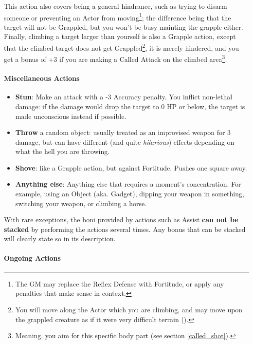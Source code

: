 \begin{itemize}
    This action also covers being a general hindrance, such as trying to disarm someone or preventing an Actor from moving\footnote{The GM may replace the Reflex Defense with Fortitude, or apply any penalties that make sense in context.}; the difference being that the target will not be Grappled, but you won't be busy mainting the grapple either. \\
    Finally, climbing a target larger than yourself is also a Grapple action, except that the climbed target does not get Grappled\footnote{You will move along the Actor which you are climbing, and may move upon the grappled creature as if it were very difficult terrain ().}, it is merely hindered, and you get a bonus of +3 if you are making a Called Attack on the climbed area\footnote{Meaning, you aim for this specific body part (see section \ref{called_shot}).}.
\end{itemize}



\paragraph{Miscellaneous Actions}
\begin{itemize}
    \item \textbf{Stun}: Make an attack with a -3 Accuracy penalty. You inflict non-lethal damage: if the damage would drop the target to 0 HP or below, the target is made unconscious instead if possible. 
    \item \textbf{Throw} a random object: usually treated as an improvised weapon for 3 damage, but can have different (and quite \textit{hilarious}) effects depending on what the hell you are throwing.
    \item \textbf{Shove}: like a Grapple action, but against Fortitude. Pushes one square away.
	\item \textbf{Anything else}: Anything else that requires a moment's concentration. For example, using an Object (aka. Gadget), dipping your weapon in something, switching your weapon, or climbing a horse.
\end{itemize}

With rare exceptions, the boni provided by actions such as Assist \textbf{can not be stacked} by performing the actions several times. Any bonus that can be stacked will clearly state so in its description.

\paragraph{Ongoing Actions}

